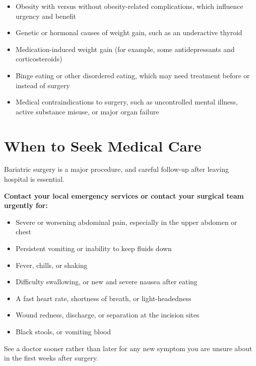 \begin{itemize}
    \item Obesity with versus without obesity-related complications, which influence urgency and benefit
    \item Genetic or hormonal causes of weight gain, such as an underactive thyroid
    \item Medication-induced weight gain (for example, some antidepressants and corticosteroids)
    \item Binge eating or other disordered eating, which may need treatment before or instead of surgery
    \item Medical contraindications to surgery, such as uncontrolled mental illness, active substance misuse, or major organ failure
\end{itemize}

\section*{When to Seek Medical Care}
Bariatric surgery is a major procedure, and careful follow-up after leaving hospital is essential.

\textbf{Contact your local emergency services or contact your surgical team urgently for:}
\begin{itemize}
    \item Severe or worsening abdominal pain, especially in the upper abdomen or chest
    \item Persistent vomiting or inability to keep fluids down
    \item Fever, chills, or shaking
    \item Difficulty swallowing, or new and severe nausea after eating
    \item A fast heart rate, shortness of breath, or light-headedness
    \item Wound redness, discharge, or separation at the incision sites
    \item Black stools, or vomiting blood
\end{itemize}

See a doctor sooner rather than later for any new symptom you are unsure about in the first weeks after surgery.

